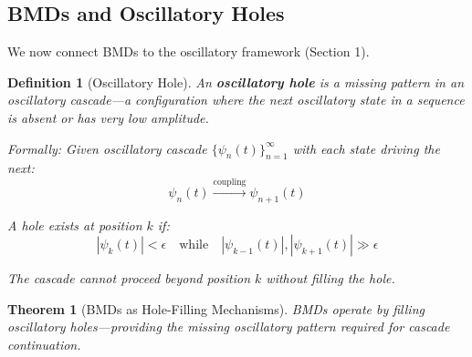 \documentclass[12pt,a4paper]{article}
\newtheorem{theorem}{Theorem}
\newtheorem{definition}{Definition}
\begin{document}
\subsection{BMDs and Oscillatory Holes}

We now connect BMDs to the oscillatory framework (Section 1).

\begin{definition}[Oscillatory Hole]
\label{def:oscillatory_hole}
An \textbf{oscillatory hole} is a missing pattern in an oscillatory cascade—a configuration where the next oscillatory state in a sequence is absent or has very low amplitude.

Formally: Given oscillatory cascade $\{\psi_n(t)\}_{n=1}^{\infty}$ with each state driving the next:
\begin{equation}
\psi_n(t) \xrightarrow{\text{coupling}} \psi_{n+1}(t)
\end{equation}

A hole exists at position $k$ if:
\begin{equation}
|\psi_k(t)| < \epsilon \quad \text{while} \quad |\psi_{k-1}(t)|, |\psi_{k+1}(t)| \gg \epsilon
\end{equation}

The cascade cannot proceed beyond position $k$ without filling the hole.
\end{definition}

\begin{theorem}[BMDs as Hole-Filling Mechanisms]
\label{thm:bmd_hole_filling}
BMDs operate by filling oscillatory holes—providing the missing oscillatory pattern required for cascade continuation.
\end{theorem}
\end{document}

